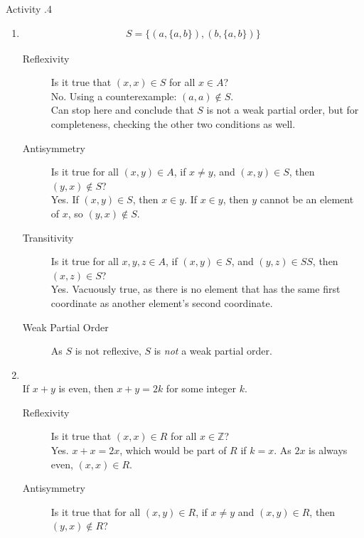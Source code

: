 \documentclass[\main/notes.tex]{subfiles}
\begin{document}
				\begin{exercise}{Activity \thechapter.4}
					\begin{enumerate}[label=(\alph*)]
						\item {}
							\begin{align*}
								S = \bigl\{(a, \{a, b\}), (b, \{a, b\})\bigr\}
							\end{align*}
							\begin{description}
								\item[Reflexivity] Is it true that $(x, x) \in S$ for all $x \in A$?\\
									No. Using a counterexample: $(a, a) \notin S$.\\
									Can stop here and conclude that $S$ is not a weak partial order, but for completeness, checking the other two conditions as well.
								\item[Antisymmetry] Is it true for all $(x, y) \in A$, if $x \neq y$, and $(x, y) \in S$, then $(y, x) \notin S$?\\
									Yes. If $(x, y) \in S$, then $x \in y$. If $x \in y$, then $y$ cannot be an element of $x$, so $(y, x) \notin S$.
								\item[Transitivity] Is it true for all $x, y, z \in A$, if $(x, y) \in S$, and $(y, z) \in SS$, then $(x, z) \in S$?\\
									Yes. Vacuously true, as there is no element that has the same first coordinate as another element's second coordinate.
								\item[Weak Partial Order] As $S$ is not reflexive, $S$ is \emph{not} a weak partial order.
							\end{description}
						\item {}\\
							If $x + y$ is even, then $x + y = 2k$ for some integer $k$.
							\begin{description}
								\item[Reflexivity] Is it true that $(x, x) \in R$ for all $x \in \mathbb{Z}$?\\
									Yes. $x + x = 2x$, which would be part of $R$ if $k = x$. As $2x$ is always even, $(x, x) \in R$.
								\item[Antisymmetry] Is it true that for all $(x, y) \in R$, if $x \neq y$ and $(x, y) \in R$, then $(y, x) \notin R$?\\

\end{description}
\end{enumerate}
\end{exercise}
\end{document}
